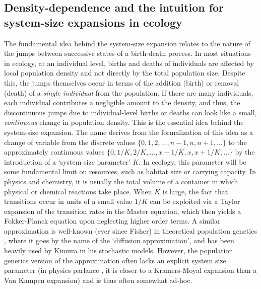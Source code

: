 \subsection{Density-dependence and the intuition for system-size expansions in ecology}
The fundamental idea behind the system-size expansion relates to the nature of the jumps between successive states of a birth-death process. In most situations in ecology, at an individual level, births and deaths of individuals are affected by local population density and not directly by the total population size. Despite this, the jumps themselves occur in terms of the addition (birth) or removal (death) of a \emph{single individual} from the population. If there are many individuals, each individual contributes a negligible amount to the density, and thus, the discontinuous jumps due to individual-level births or deaths can look like a small, \emph{continuous} change in population density. This is the essential idea behind the system-size expansion. The name derives from the formalization of this idea as a change of variable from the discrete values $\{0,1,2,\ldots,n-1,n,n+1,\ldots\}$ to the approximately continuous values $\{0,1/K,2/K,\dots,x-1/K,x,x+1/K,\ldots\}$ by the introduction of a `system size parameter' $K$. In ecology, this parameter will be some fundamental limit on resources, such as habitat size or carrying capacity. In physics and chemistry, it is usually the total volume of a container in which physical or chemical reactions take place. When $K$ is large, the fact that transitions occur in units of a small value $1/K$ can be exploited via a Taylor expansion of the transition rates in the Master equation, which then yields a Fokker-Planck equation upon neglecting higher order terms. A similar approximation is well-known (ever since Fisher) in theoretical population genetics \citep{ewens_mathematical_2004}, where it goes by the name of the `diffusion approximation', and has been heavily used by Kimura \citep{crow_introduction_1970} in his stochastic models. However, the population genetics version of the approximation often lacks an explicit system size parameter (in physics parlance \citep{gardiner_stochastic_2009}, it is closer to a Kramers-Moyal expansion than a Van Kampen expansion) and is thus often somewhat ad-hoc.



